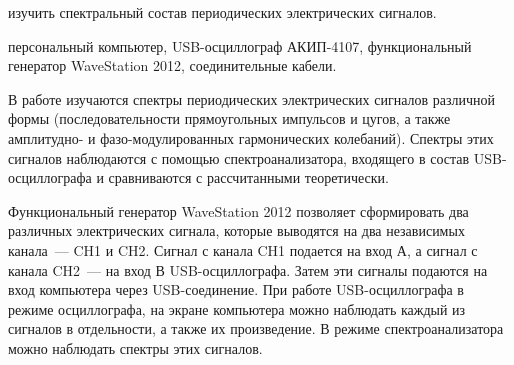 
\begin{lab:aim}
	изучить спектральный состав периодических электрических сигналов.
\end{lab:aim}

\begin{lab:equipment}
персональный компьютер, USB-осциллограф АКИП-4107, функциональный генератор WaveStation 2012, соединительные кабели.
\end{lab:equipment}

В работе изучаются спектры периодических электрических сигналов различной формы (последовательности прямоугольных импульсов и цугов, а также амплитудно- и фазо-модулированных гармонических колебаний). Спектры этих сигналов наблюдаются с помощью спектроанализатора, входящего в состав USB-осциллографа и сравниваются с рассчитанными теоретически.

\begin{figure}
	\label{fig:631}
\end{figure}

\experiment
Функциональный генератор WaveStation 2012 позволяет сформировать два различных электрических сигнала, которые выводятся на два независимых канала~--- CH1 и CH2. Сигнал с канала CH1 подается на вход А, а сигнал с канала CH2~--- на вход В USB-осциллографа. Затем эти сигналы подаются на вход компьютера через USB-соединение. При работе USB-осциллографа в режиме осциллографа, на экране компьютера можно наблюдать каждый из сигналов в отдельности, а также их произведение. В режиме спектроанализатора можно наблюдать спектры этих сигналов.

